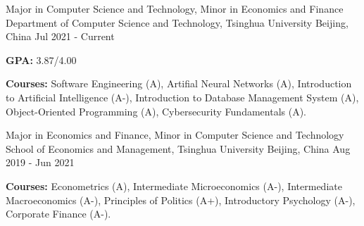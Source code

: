 

\begin{cventries}


  \cventry
    {Major in Computer Science and Technology, Minor in Economics and Finance} %
    {Department of Computer Science and Technology, Tsinghua University} %
    {Beijing, China} %
    {Jul 2021 - Current} %
    {
      \begin{cvitems} %
        \item {\textbf{GPA:}} 3.87/4.00
        \item {\textbf{Courses:} Software Engineering (A), Artifial Neural Networks (A), Introduction to Artificial Intelligence (A-), Introduction to Database Management System (A), Object-Oriented Programming (A), Cybersecurity Fundamentals (A).}
      \end{cvitems}
    }
    
  \cventry
    {Major in Economics and Finance, Minor in Computer Science and Technology} %
    {School of Economics and Management, Tsinghua University} %
    {Beijing, China} %
    {Aug 2019 - Jun 2021} %
    {
      \begin{cvitems} %
        \item {\textbf{Courses:} Econometrics (A), Intermediate Microeconomics (A-), Intermediate Macroeconomics (A-), Principles of Politics (A+), Introductory Psychology (A-), Corporate Finance (A-).}
      \end{cvitems}
    }

\end{cventries}
